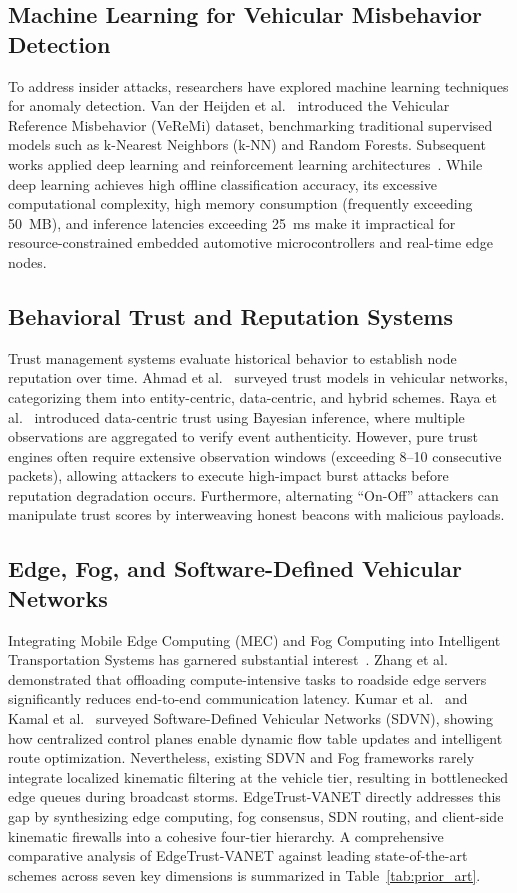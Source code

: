\documentclass[conference]{IEEEtran}
\begin{document}
\subsection{Machine Learning for Vehicular Misbehavior Detection}
To address insider attacks, researchers have explored machine learning techniques for anomaly detection. Van der Heijden et al.~\cite{veremi} introduced the Vehicular Reference Misbehavior (VeReMi) dataset, benchmarking traditional supervised models such as k-Nearest Neighbors (k-NN) and Random Forests. Subsequent works applied deep learning and reinforcement learning architectures~\cite{so2018verifying, sedar2020reinforcement, alrehan2019machine}. While deep learning achieves high offline classification accuracy, its excessive computational complexity, high memory consumption (frequently exceeding 50~MB), and inference latencies exceeding 25~ms make it impractical for resource-constrained embedded automotive microcontrollers and real-time edge nodes.

\subsection{Behavioral Trust and Reputation Systems}
Trust management systems evaluate historical behavior to establish node reputation over time. Ahmad et al.~\cite{trustsurvey} surveyed trust models in vehicular networks, categorizing them into entity-centric, data-centric, and hybrid schemes. Raya et al.~\cite{raya} introduced data-centric trust using Bayesian inference, where multiple observations are aggregated to verify event authenticity. However, pure trust engines often require extensive observation windows (exceeding 8--10 consecutive packets), allowing attackers to execute high-impact burst attacks before reputation degradation occurs. Furthermore, alternating ``On-Off'' attackers can manipulate trust scores by interweaving honest beacons with malicious payloads.

\subsection{Edge, Fog, and Software-Defined Vehicular Networks}
Integrating Mobile Edge Computing (MEC) and Fog Computing into Intelligent Transportation Systems has garnered substantial interest~\cite{fogvanet}. Zhang et al.~\cite{fogvanet} demonstrated that offloading compute-intensive tasks to roadside edge servers significantly reduces end-to-end communication latency. Kumar et al.~\cite{sdnvanet} and Kamal et al.~\cite{kamal2020sdn} surveyed Software-Defined Vehicular Networks (SDVN), showing how centralized control planes enable dynamic flow table updates and intelligent route optimization. Nevertheless, existing SDVN and Fog frameworks rarely integrate localized kinematic filtering at the vehicle tier, resulting in bottlenecked edge queues during broadcast storms. EdgeTrust-VANET directly addresses this gap by synthesizing edge computing, fog consensus, SDN routing, and client-side kinematic firewalls into a cohesive four-tier hierarchy. A comprehensive comparative analysis of EdgeTrust-VANET against leading state-of-the-art schemes across seven key dimensions is summarized in Table~\ref{tab:prior_art}.
\end{document}
